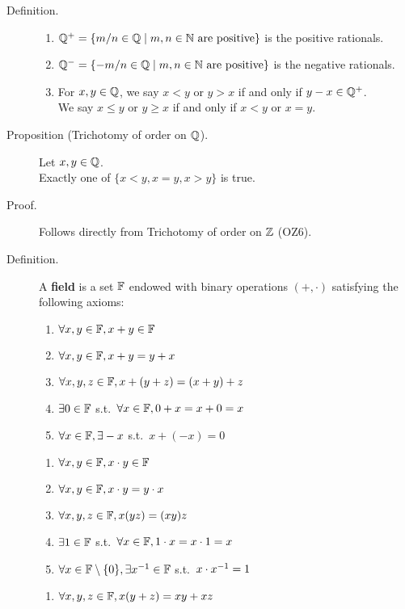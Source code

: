 \documentclass[letterpaper,11pt]{article}
\begin{document}
\begin{description}
\item[Definition.]\mbox{}
  \begin{enumerate}[1)]
  \item $\mathbb{Q}^+ = \{m/n\in\mathbb{Q}\;|\;m,n\in\mathbb{N}\text{ are positive}\}$
      is the positive rationals.
  \item $\mathbb{Q}^- = \{-m/n\in\mathbb{Q}\;|\;m,n\in\mathbb{N}\text{ are positive}\}$
      is the negative rationals.
  \item For $x,y\in\mathbb{Q}$, we say $x<y$ or $y>x$ if and only if $y-x\in\mathbb{Q}^+$.\\
      We say $x\le y$ or $y\ge x$ if and only if $x<y$ or $x=y$.
  \end{enumerate}


\item[Proposition (Trichotomy of order on $\mathbb{Q}$).] Let $x,y\in\mathbb{Q}$.\\
    Exactly one of $\{x<y,x=y,x>y\}$ is true.
\item[Proof.] Follows directly from Trichotomy of order on $\mathbb{Z}$ (OZ6).


\newpage
\item[Definition.] A \textbf{field} is a set $\mathbb{F}$ endowed with
    binary operations $(+,\cdot)$ satisfying the following axioms:
    \begin{multicols}{2}
    \begin{enumerate}[({A}1)]
    \item $\forall x,y\in\mathbb{F}, x+y\in\mathbb{F}$
    \item $\forall x,y\in\mathbb{F}, x+y=y+x$
    \item $\forall x,y,z\in\mathbb{F}, x+(y+z)=(x+y)+z$
    \item $\exists 0\in\mathbb{F}$ s.t.\ $\forall x\in\mathbb{F}, 0+x=x+0=x$
    \item $\forall x\in\mathbb{F}, \exists-x$ s.t.\ $x+(-x)=0$
    \end{enumerate}
    \begin{enumerate}[(M1)]
    \item $\forall x,y\in\mathbb{F}, x\cdot y\in\mathbb{F}$
    \item $\forall x,y\in\mathbb{F}, x\cdot y=y\cdot x$
    \item $\forall x,y,z\in\mathbb{F}, x(yz)=(xy)z$
    \item $\exists 1\in\mathbb{F}$ s.t.\ $\forall x\in\mathbb{F},1\cdot x=x\cdot1=x$
    \item $\forall x\in\mathbb{F}\setminus\{0\},\exists{x^{-1}}\in\mathbb{F}$
        s.t.\ $x\cdot{x^{-1}}=1$
    \end{enumerate}
    \end{multicols}
    \vspace{-0.27in}
    \begin{enumerate}[(D1)]
    \item $\forall x,y,z\in\mathbb{F}, x(y+z)=xy+xz$
    \end{enumerate}



\end{description}
\end{document}
